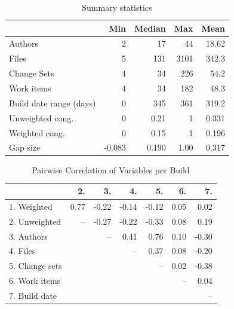 \documentclass[12pt,oneside]{book}
\begin{document}

\begin{table}[t]
\centering
\begin{tabular}{l|rrrr}


 & Min & Median & Max & Mean\\\hline
Authors & 2 & 17 & 44 & 18.62\\
Files & 5 & 131 & 3101 & 342.3 \\
Change Sets & 4  & 34  & 226 & 54.2\\
Work items & 4 & 34  & 182 & 48.3 \\
Build date range (days) & 0  & 345  & 361 & 319.2 \\
Unweighted cong. & 0  & 0.21  & 1 & 0.331 \\
Weighted cong. & 0 & 0.15  & 1 & 0.196\\
Gap size & -0.083 & 0.190 & 1.00 & 0.317 \\
\hline
\end{tabular}
\caption{Summary statistics}
\label{tab:summary}
\end{table}

\begin{table}[t]
\begin{center}
\begin{tabular}{l|rrrrrr}


 & 2. & 3. & 4. & 5. & 6. & 7. \\ 
  \hline
   1. Weighted & 0.77 & -0.22 & -0.14 & -0.12 & 0.05 & 0.02 \\ 
   2. Unweighted  &-- & -0.27 & -0.22 & -0.33 & 0.08 & 0.19 \\ 
   3. Authors &  & --& 0.41 & 0.76 & 0.10 & -0.30 \\ 
   4. Files &  &  & --& 0.37 & 0.08 & -0.20 \\ 
   5. Change sets &  &  &  &  --& 0.02 & -0.38 \\ 
   6. Work items  &  &  &  &  &  --& 0.04 \\ 
   7. Build date &  &  &  &  &  & -- \\ 
\hline

\end{tabular}
\end{center}
\caption{Pairwise Correlation of Variables per Build}
\label{tab:pairwise}
\end{table}
\end{document}
